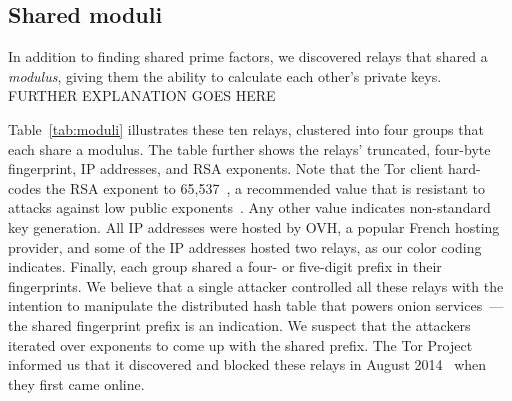 \subsection{Shared moduli}
\label{sec:shared-moduli}
In addition to finding shared prime factors, we discovered relays that shared a
\emph{modulus}, giving them the ability to calculate each other's private keys.
FURTHER EXPLANATION GOES HERE

Table~\ref{tab:moduli} illustrates these ten relays, clustered into four groups
that each share a modulus.  The table further shows the relays' truncated,
four-byte fingerprint, IP addresses, and RSA exponents.  Note that the Tor
client hard-codes the RSA exponent to 65,537~\cite[\S~0.3]{torspec}, a
recommended value that is resistant to attacks against low public
exponents~\cite[\S~4]{Boneh1999a}.  Any other value indicates non-standard key
generation.  All IP addresses were hosted by OVH, a popular French hosting
provider, and some of the IP addresses hosted two relays, as our color coding
indicates.  Finally, each group shared a four- or five-digit prefix in their
fingerprints.  We believe that a single attacker controlled all these relays
with the intention to manipulate the distributed hash table that powers onion
services~\cite{Biryukov2013a}---the shared fingerprint prefix is an indication.
We suspect that the attackers iterated over exponents to come up with the shared
prefix.  The Tor Project informed us that it discovered and blocked these relays
in August 2014~\cite{tor-priv1} when they first came online.

